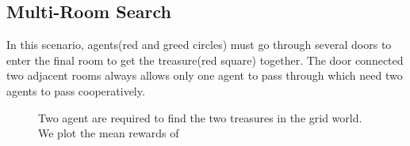 \documentclass{article} %
\begin{document}
\subsection{Multi-Room Search}
In this scenario, agents(red and greed circles) must go through several doors to enter the final room to get the treasure(red square) together. The door connected two adjacent rooms always allows only one agent to pass through which need two agents to pass cooperatively.
\begin{figure}
\centering
    \caption{Two agent are required to find the two treasures in the grid world. We plot the mean rewards of }
    \label{multi-Room search}
\end{figure}
\end{document}
